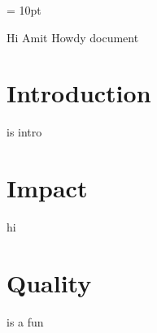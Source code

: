 \documentclass{euria}
\begin{document}
\maketitle
\baselineskip = 10pt
\thispagestyle{titlePage}
\pagestyle{fancy}
\renewcommand{\baselinestretch}{1}
\setlength{\parskip}{10pt}
%

% 
% 
% 
% 
% 
% 
% 
% 


Hi Amit
Howdy document
\section{Introduction}
\cite{zuccato2008illicit} is intro
\cite{kolpin2002pharmaceuticals}


\clearpage
\section{Impact}
hi \cite{zuccato2008illicit}

\clearpage
\section{Quality}
\cite{zuccato2008illicit} is a fun
\cite{kolpin2002pharmaceuticals}

% 
% 
% 
% 


%
%
\end{document}
